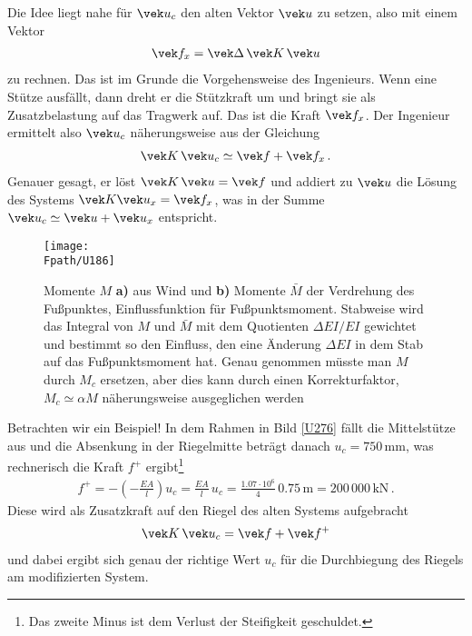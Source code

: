 {{{{Die Idee liegt nahe f\"{u}r $\vek u_c$ den alten Vektor $\vek u$ zu setzen, also mit einem Vektor
\begin{align}
\vek f_x = \vek \Delta \,\vek K\,\vek u
\end{align}
zu rechnen. Das ist im Grunde die Vorgehensweise des Ingenieurs. Wenn eine St\"{u}tze ausf\"{a}llt, dann dreht er die St\"{u}tzkraft um und bringt sie als Zusatzbelastung auf das Tragwerk auf. Das ist die Kraft $\vek f_x$. Der Ingenieur ermittelt also $\vek u_c$ n\"{a}herungsweise aus der Gleichung
\begin{align}
\vek K\,\vek u_c \simeq \vek f + \vek f_x\,.
\end{align}
Genauer gesagt, er l\"{o}st $\vek K\,\vek u = \vek f$ und addiert zu $\vek u$ die L\"{o}sung des Systems $\vek K\vek u_x = \vek f_x$, was in der Summe
$\vek  u_c \simeq \vek u + \vek u_x$ entspricht.
\begin{figure}[tbp]
\centering
\texttt{[image: \\Fpath/U186]}
\caption{Momente $M$ \textbf{ a)} aus Wind und \textbf{ b)} Momente $\bar{M}$ der Verdrehung des Fu{\ss}punktes, Einflussfunktion f\"{u}r Fu{\ss}punktsmoment. Stabweise wird das Integral von $M$ und $\bar{M}$ mit dem Quotienten $\Delta EI/EI$ gewichtet und bestimmt so den Einfluss, den eine \"{A}nderung $\Delta EI$ in dem Stab auf das Fu{\ss}punktsmoment hat. Genau genommen m\"{u}sste man $M$ durch $M_c$ ersetzen, aber dies kann durch einen Korrekturfaktor, $M_c \simeq \alpha M$ n\"{a}herungsweise ausgeglichen werden}
\label{U186}
%
\end{figure}%

Betrachten wir ein Beispiel! In dem Rahmen in Bild \ref{U276} f\"{a}llt die Mittelst\"{u}tze aus und die Absenkung in der Riegelmitte betr\"{a}gt danach $u_c = 750$\,mm, was rechnerisch die Kraft $f^+$ ergibt\footnote{Das zweite Minus ist dem Verlust der Steifigkeit geschuldet.}
\begin{align}
f^+ = - (- \frac{EA}{l}) u_c = \frac{EA}{l}\,u_c = \frac{1.07\cdot 10^6}{4} \,0.75\,\text{m} = 200\,000\,\text{kN}\,.
\end{align}
Diese wird als Zusatzkraft auf den Riegel des alten Systems aufgebracht
\begin{align}
\vek K\,\vek u_c = \vek f + \vek f^+
\end{align}
und dabei ergibt sich genau der richtige Wert $u_c$ f\"{u}r die Durchbiegung des Riegels am modifizierten System.

}}}}
